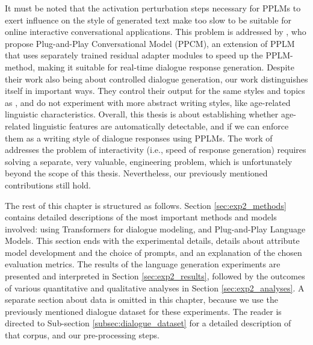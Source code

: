 

It must be noted that the activation perturbation steps necessary for PPLMs to exert influence on the style of generated text make too slow to be suitable for online interactive conversational applications. This problem is addressed by \cite{madotto-etal-2020-plug}, who propose Plug-and-Play Conversational Model (PPCM), an extension of PPLM that uses separately trained residual adapter modules to speed up the PPLM-method, making it suitable for real-time dialogue response generation. Despite their work also being about controlled dialogue generation, our work distinguishes itself in important ways. They control their output for the same styles and topics as \cite{dathathri2019plug}, and do not experiment with more abstract writing styles, like age-related linguistic characteristics. Overall, this thesis is about establishing whether age-related linguistic features are automatically detectable, and if we can enforce them as a writing style of dialogue responses using PPLMs. The work of \cite{madotto-etal-2020-plug} addresses the problem of interactivity (i.e., speed of response generation) requires solving a separate, very valuable, engineering problem, which is unfortunately beyond the scope of this thesis. Nevertheless, our previously mentioned contributions still hold.

The rest of this chapter is structured as follows. Section \ref{sec:exp2_methods} contains detailed descriptions of the most important methods and models involved: using Transformers for dialogue modeling, and Plug-and-Play Language Models. This section ends with the experimental details, details about attribute model development and the choice of prompts, and an explanation of the chosen evaluation metrics. The results of the language generation experiments are presented and interpreted in Section \ref{sec:exp2_results}, followed by the outcomes of various quantitative and qualitative analyses in Section \ref{sec:exp2_analyses}. A separate section about data is omitted in this chapter, because we use the previously mentioned dialogue dataset for these experiments. The reader is directed to Sub-section \ref{subsec:dialogue_dataset} for a detailed description of that corpus, and our pre-processing steps.


